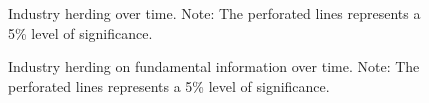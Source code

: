 \documentclass[
  letterpaper,
  DIV=11,
  numbers=noendperiod]{scrartcl}
\begin{document}
\renewcommand*{\arraystretch}{1}

\newpage

\begin{figure}[H]


\caption{\label{fig-rol_gen}Industry herding over time. Note: The
perforated lines represents a 5\% level of significance.}

\end{figure}%

\newpage

\begin{figure}[H]


\caption{\label{fig-rol_fundamental}Industry herding on fundamental
information over time. Note: The perforated lines represents a 5\% level
of significance.}

\end{figure}%
\end{document}
